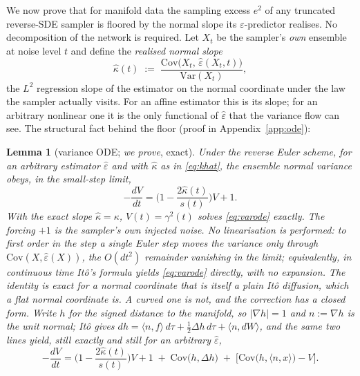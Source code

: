 \documentclass[11pt]{article}
\newtheorem{lemma}{Lemma}
\theoremstyle{remark}
\newcommand{\eps}{\varepsilon}
\newcommand{\epshat}{\hat\varepsilon}
\newcommand{\Var}{\mathrm{Var}}
\newcommand{\Cov}{\mathrm{Cov}}
\begin{document}
We now prove that for manifold data the sampling excess $e^2$ of any truncated
reverse-SDE sampler is floored by the normal slope its $\eps$-predictor realises. No
decomposition of the network is required. Let $X_t$ be the sampler's \emph{own} ensemble at
noise level $t$ and define the \emph{realised normal slope}
\begin{equation}
\hat\kappa(t)\;:=\;\frac{\Cov\big(X_t,\,\epshat(X_t,t)\big)}{\Var(X_t)},
\label{eq:khat}
\end{equation}
the $L^2$ regression slope of the estimator on the normal coordinate under the law the
sampler actually visits. For an affine estimator this is its slope; for an arbitrary
nonlinear one it is the only functional of $\epshat$ that the variance flow can see.
The structural fact behind the floor (proof in Appendix~\ref{app:ode}):

\begin{lemma}[variance ODE; \emph{we prove}, exact]\label{lem:ode}
Under the reverse Euler scheme, for an \emph{arbitrary} estimator $\epshat$ and with
$\hat\kappa$ as in \eqref{eq:khat}, the ensemble normal variance obeys, in the small-step
limit,
\begin{equation}
-\frac{dV}{dt}=\Big(1-\frac{2\hat\kappa(t)}{s(t)}\Big)V+1 .
\label{eq:varode}
\end{equation}
With the exact slope $\hat\kappa=\kappa$, $V(t)=\gamma^2(t)$ solves \eqref{eq:varode}
exactly. The forcing $+1$ is the sampler's own injected noise. No linearisation is
performed: to first order in the step a single Euler step moves the variance only through
$\Cov(X,\epshat(X))$, the $O(dt^2)$ remainder vanishing in the limit; equivalently, in
continuous time It\^o's formula yields \eqref{eq:varode} directly, with no expansion. The
identity is exact for a normal coordinate that is itself a plain It\^o diffusion, which a
\emph{flat} normal coordinate is. A curved one is not, and the correction has a closed
form. Write $h$ for the signed distance to the manifold, so $|\nabla h|=1$ and
$n:=\nabla h$ is the unit normal; It\^o gives
$dh=\langle n,f\rangle\,d\tau+\tfrac12\Delta h\,d\tau+\langle n,dW\rangle$, and the same
two lines yield, still exactly and still for an arbitrary $\epshat$,
\begin{equation}
-\frac{dV}{dt}=\Big(1-\frac{2\hat\kappa(t)}{s(t)}\Big)V+1
\;+\;\Cov\big(h,\Delta h\big)\;+\;\big[\Cov\big(h,\langle n,x\rangle\big)-V\big].
\label{eq:varode-curved}
\end{equation}
\end{lemma}
\end{document}
